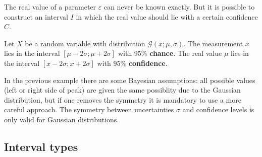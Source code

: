{	The real value of a parameter $\varepsilon$ can never be known exactly. But it is possible to construct an interval $I$ in which the real value should lie with a certain confidence $C$.
	\begin{example}
		Let $X$ be a random variable with distribution $\mathcal{G}(x;\mu, \sigma)$. The measurement $x$ lies in the interval $[\mu - 2\sigma;\mu+2\sigma]$ with 95\% \textbf{chance}. The real value $\mu$ lies in the interval $[x - 2\sigma;x+2\sigma]$ with 95\% \textbf{confidence}.
	\end{example}
	\begin{remark*}
		In the previous example there are some Bayesian assumptions: all possible values (left or right side of peak) are given the same possiblity due to the Gaussian distribution, but if one removes the symmetry it is mandatory to use a more careful approach. The symmetry between uncertainties $\sigma$ and confidence levels is only valid for Gaussian distributions.
	\end{remark*}
    
\subsection{Interval types}

    

}
